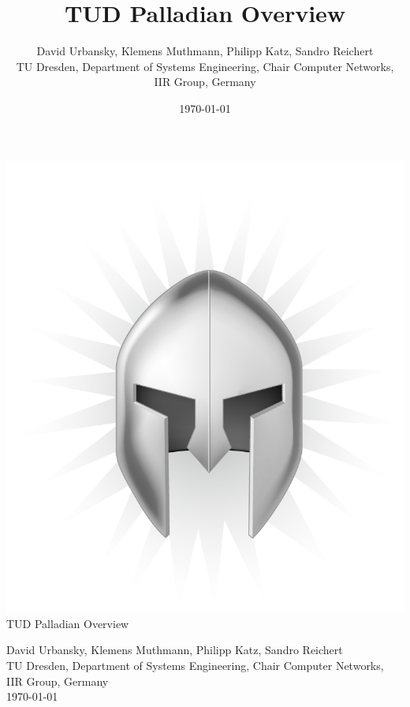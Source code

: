 \documentclass[a4paper,twoside]{book}      %
\date{\today}
\title{TUD Palladian Overview}
\author{David Urbansky, Klemens Muthmann, Philipp Katz, Sandro Reichert \\
{\small TU Dresden, Department of Systems Engineering, Chair Computer Networks, IIR Group, Germany}
}
\newcommand{\bigsize}{\fontsize{18pt}{10pt}\selectfont}
\newcommand{\titleelementsize}{\fontsize{12pt}{10pt}\selectfont}
\begin{document}

\begin{titlepage}
\centering

\includegraphics[scale=0.4]{img/Palladian_Logo_DRAFT.png} \\
{\bigsize TUD Palladian Overview} \\

\vspace{1.5cm}

{\titleelementsize David Urbansky, Klemens Muthmann, Philipp Katz, Sandro Reichert} \\
\vspace{0.1cm}
{\small TU Dresden, Department of Systems Engineering, Chair Computer Networks, IIR Group, Germany} \\
\vspace{0.8cm}
{\titleelementsize \today} \\
\vspace{2cm}
\end{titlepage}



\tableofcontents

\normalsize
{}

 


\end{document}
